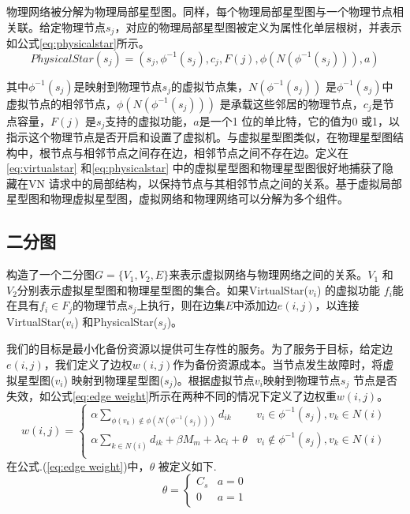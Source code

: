 物理网络被分解为物理局部星型图。同样，每个物理局部星型图与一个物理节点相关联。给定物理节点$s_j$，对应的物理局部星型图被定义为属性化单层根树，并表示如公式\ref{eq:physicalstar}所示。
\begin{equation}
PhysicalStar(s_j)=(s_j, \phi^{-1}( s_j), c_j, F(j), \phi(N(\phi^{-1}( s_j))), a)
\label{eq:physicalstar}
\end{equation}

其中$\phi^{-1}( s_j)$是映射到物理节点$s_j$的虚拟节点集，$N(\phi^{-1}( s_j))$ 是$\phi^{-1}( s_j)$中虚拟节点的相邻节点，$\phi(N(\phi^{-1}( s_j)))$ 是承载这些邻居的物理节点，$c_j$是节点容量，$F(j)$ 是$s_j$支持的虚拟功能，$a$是一个1 位的单比特，它的值为0 或1，以指示这个物理节点是否开启和设置了虚拟机。与虚拟星型图类似，在物理星型图结构中，根节点与相邻节点之间存在边，相邻节点之间不存在边。定义在\ref{eq:virtualstar} 和\ref{eq:physicalstar} 中的虚拟星型图和物理星型图很好地捕获了隐藏在VN 请求中的局部结构，以保持节点与其相邻节点之间的关系。基于虚拟局部星型图和物理虚拟星型图，虚拟网络和物理网络可以分解为多个组件。

\subsection{二分图}
构造了一个二分图$G=\{V_1,V_2,E\}$来表示虚拟网络与物理网络之间的关系。$V_1$ 和$V_2$分别表示虚拟星型图和物理星型图的集合。如果VirtualStar($v_i$) 的虚拟功能 $f_i$能在具有${f_i} \in {F_j}$的物理节点$s_j$上执行，则在边集$E$中添加边$e(i,j)$，以连接VirtualStar($v_i$) 和PhysicalStar($s_j$)。

我们的目标是最小化备份资源以提供可生存性的服务。为了服务于目标，给定边$e(i,j)$，我们定义了边权$w(i,j)$作为备份资源成本。当节点发生故障时，将虚拟星型图($v_i$) 映射到物理星型图($s_j$)。根据虚拟节点$v_i$映射到物理节点$s_j$ 节点是否失效，如公式\ref{eq:edge weight}所示在两种不同的情况下定义了边权重$w(i,j)$。
\begin{equation}
w(i,j) = \left\{ {\begin{array}{*{20}{c}}
   { \alpha \sum\limits_{\phi ({v_k}) \notin \phi (N({\phi ^{ - 1}}({s_j})))} {{d_{ik}}} } & {{v_i} \in {\phi ^{ - 1}}({s_j}),v_k \in N(i)}  \\
   {\alpha \sum\limits_{k \in N(i)} {{d_{ik}}}  + \beta {M_m} + \lambda {c_i} + \theta } & {{v_i} \notin {\phi ^{ - 1}}({s_j}),v_k \in N(i)}  \\
\end{array}} \right.
\label{eq:edge weight}
\end{equation}
在公式.(\ref{eq:edge weight})中，$\theta$ 被定义如下.
\begin{equation}
\theta  = \left\{ {\begin{array}{*{20}{c}}
   {{C_s}} & {a = 0}  \\
   0 & {a = 1}  \\
\end{array}} \right.
\end{equation}

